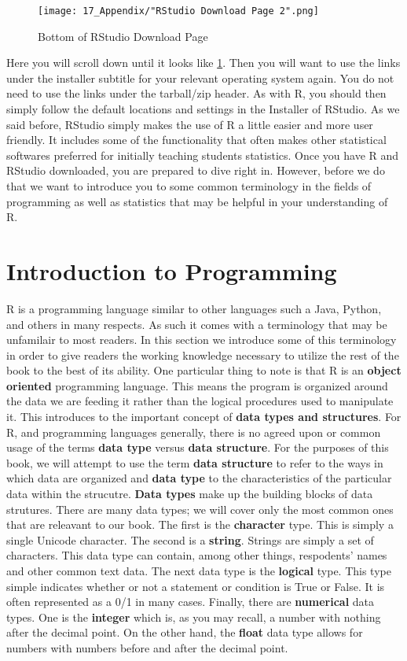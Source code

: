 \documentclass[11pt,openany]{book}\usepackage[]{graphicx}\usepackage[]{color}
\begin{document}
{\begin{figure}[h]
\centering
\texttt{[image: 17\_Appendix/"RStudio Download Page 2".png]}
\caption{Bottom of RStudio Download Page 
\label{fig:brsdp}}
\end{figure}


Here you will scroll down until it looks like \ref{fig:brsdp}. Then you will want to use the links under the installer subtitle for your relevant operating system again. You do not need to use the links under the tarball/zip header. As with R, you should then simply follow the default locations and settings in the Installer of RStudio. As we said before, RStudio simply makes the use of R a little easier and more user friendly. It includes some of the functionality that often makes other statistical softwares preferred for initially teaching students statistics. Once you have R and RStudio downloaded, you are prepared to dive right in. However, before we do that we want to introduce you to some common terminology in the fields of programming as well as statistics that may be helpful in your understanding of R.

\section{Introduction to Programming}

R is a programming language similar to other languages such a Java, Python, and others in many respects. As such it comes with a terminology that may be unfamilair to most readers. In this section we introduce some of this terminology in order to give readers the working knowledge necessary to utilize the rest of the book to the best of its ability. One particular thing to note is that R is an \textbf{object oriented} programming language. This means the program is organized around the data we are feeding it rather than the logical procedures used to manipulate it. This introduces to the important concept of \textbf{data types and structures}. For R, and programming languages generally, there is no agreed upon or common usage of the terms \textbf{data type} versus \textbf{data structure}. For the purposes of this book, we will attempt to use the term \textbf{data structure} to refer to the ways in which data are organized and \textbf{data type} to the characteristics of the particular data within the strucutre. \textbf{Data types} make up the building blocks of data strutures. There are many data types; we will cover only the most common ones that are releavant to our book. The first is the \textbf{character} type. This is simply a single Unicode character. The second is a \textbf{string}. Strings are simply a set of characters. This data type can contain, among other things, respodents' names and other common text data. The next data type is the \textbf{logical} type. This type simple indicates whether or not a statement or condition is True or False. It is often represented as a 0/1 in many cases. Finally, there are \textbf{numerical} data types. One is the \textbf{integer} which is, as you may recall, a number with nothing after the decimal point. On the other hand, the \textbf{float} data type allows for numbers with numbers before and after the decimal point.

}
\end{document}

